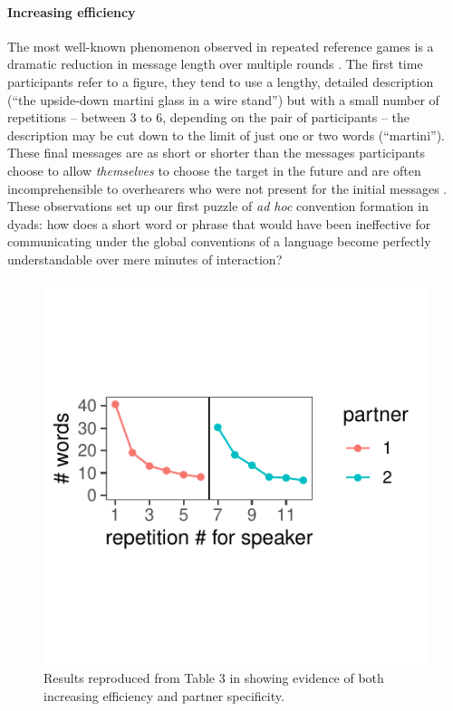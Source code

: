 \paragraph{Increasing efficiency}

The most well-known phenomenon observed in repeated reference games is a dramatic reduction in message length over multiple rounds \cite{krauss_changes_1964, ClarkWilkesGibbs86_ReferringCollaborative, hawkins2020characterizing}. 
The first time participants refer to a figure, they tend to use a lengthy, detailed description (``the upside-down martini glass in a wire stand'') but with a small number of repetitions -- between 3 to 6, depending on the pair of participants -- the description may be cut down to the limit of just one or two words (``martini''). 
These final messages are as short or shorter than the messages participants choose to allow \emph{themselves} to choose the target in the future  \cite{FussellKrauss89_IntendedAudienceCommonGround} and are often incomprehensible to overhearers who were not present for the initial messages \cite{SchoberClark89_Overhearers}.
These observations set up our first puzzle of \emph{ad hoc} convention formation in dyads: how does a short word or phrase that would have been ineffective for communicating under the global conventions of a language become perfectly understandable over mere minutes of interaction? 

\begin{figure}[t!]
\centering
\includegraphics[scale=1.2]{./figures/clark92}
\vspace{1em}
\caption{Results reproduced from Table 3 in \protect{} showing evidence of both increasing efficiency and partner specificity.}
\label{fig:clark92}
\end{figure}

